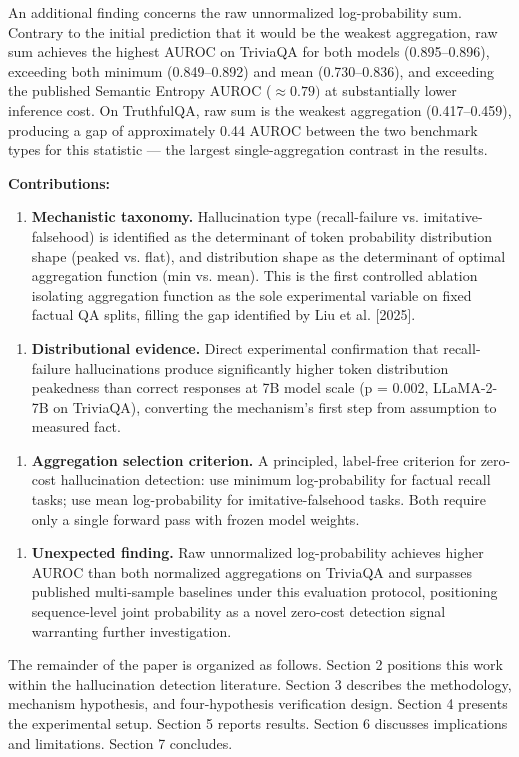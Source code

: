 An additional finding concerns the raw unnormalized log-probability sum. Contrary to the initial prediction that it would be the weakest aggregation, raw sum achieves the highest AUROC on TriviaQA for both models (0.895--0.896), exceeding both minimum (0.849--0.892) and mean (0.730--0.836), and exceeding the published Semantic Entropy AUROC ($\approx 0.79)$ \citep{Farquhar2024} at substantially lower inference cost. On TruthfulQA, raw sum is the weakest aggregation (0.417--0.459), producing a gap of approximately 0.44 AUROC between the two benchmark types for this statistic --- the largest single-aggregation contrast in the results.

\textbf{Contributions:}

\begin{enumerate}
\item \textbf{Mechanistic taxonomy.} Hallucination type (recall-failure vs. imitative-falsehood) is identified as the determinant of token probability distribution shape (peaked vs. flat), and distribution shape as the determinant of optimal aggregation function (min vs. mean). This is the first controlled ablation isolating aggregation function as the sole experimental variable on fixed factual QA splits, filling the gap identified by Liu et al. [2025].
\end{enumerate}

\begin{enumerate}
\item \textbf{Distributional evidence.} Direct experimental confirmation that recall-failure hallucinations produce significantly higher token distribution peakedness than correct responses at 7B model scale (p = 0.002, LLaMA-2-7B on TriviaQA), converting the mechanism's first step from assumption to measured fact.
\end{enumerate}

\begin{enumerate}
\item \textbf{Aggregation selection criterion.} A principled, label-free criterion for zero-cost hallucination detection: use minimum log-probability for factual recall tasks; use mean log-probability for imitative-falsehood tasks. Both require only a single forward pass with frozen model weights.
\end{enumerate}

\begin{enumerate}
\item \textbf{Unexpected finding.} Raw unnormalized log-probability achieves higher AUROC than both normalized aggregations on TriviaQA and surpasses published multi-sample baselines under this evaluation protocol, positioning sequence-level joint probability as a novel zero-cost detection signal warranting further investigation.
\end{enumerate}

The remainder of the paper is organized as follows. Section 2 positions this work within the hallucination detection literature. Section 3 describes the methodology, mechanism hypothesis, and four-hypothesis verification design. Section 4 presents the experimental setup. Section 5 reports results. Section 6 discusses implications and limitations. Section 7 concludes.

